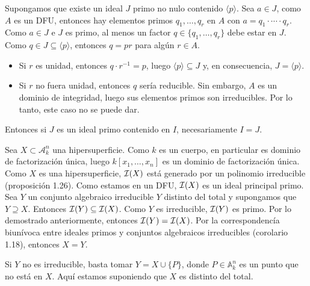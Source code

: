 \documentclass[twoside]{article}
\begin{document}
\begin{solucion}
Supongamos que existe un ideal $J$ primo no nulo contenido $\langle p \rangle$. Sea $a \in J$, como $A$ es un DFU, entonces hay elementos primos $q_1,\dots, q_r$ en $A$ con $a=q_1\cdot \cdots \cdot q_r$. Como $a \in J$ e $J$ es primo, al menos un factor $q \in \{q_1,\dots,q_r\}$ debe estar en $J$. Como $q \in J \subseteq \langle p\rangle$, entonces $q=pr$ para algún $r \in A$.
\begin{itemize}
	\item Si $r$ es unidad, entonces $q\cdot r^{-1} = p$, luego $\langle p \rangle \subseteq J$ y, en consecuencia, $J = \langle p \rangle$.
	\item Si $r$ no fuera unidad, entonces $q$ sería reducible. Sin embargo, $A$ es un dominio de integridad, luego sus elementos primos son irreducibles. Por lo tanto, este caso no se puede dar.
\end{itemize}
Entonces si $J$ es un ideal primo contenido en $I$, necesariamente $I = J$.

Sea $X \subset \mathcal{A}_k^n$ una hipersuperficie. Como $k$ es un cuerpo, en particular es dominio de factorización única, luego $k[x_1,\dots,x_n]$ es un dominio de factorización única. Como $X$ es una hipersuperficie, $\mathcal{I}(X)$ está generado por un polinomio irreducible (proposición 1.26). Como estamos en un DFU, $\mathcal{I}(X)$ es un ideal principal primo. Sea $Y$ un conjunto algebraico irreducible $Y$ distinto del total y supongamos que $Y \supseteq X$. Entonces $\mathcal{I}(Y) \subseteq \mathcal{I}(X)$. Como $Y$ es irreducible, $\mathcal{I}(Y)$ es primo. Por lo demostrado anteriormente, entonces $\mathcal{I}(Y) = \mathcal{I}(X)$. Por la correspondencía biunívoca entre ideales primos y conjuntos algebraicos irreducibles (corolario 1.18), entonces $X=Y$.

Si $Y$ no es irreducible, basta tomar $Y = X \cup \{P\}$, donde $P \in \mathbb{A}_k^n$ es un punto que no está en $X$. Aquí estamos suponiendo que $X$ es distinto del total.
\end{solucion}
\end{document}
